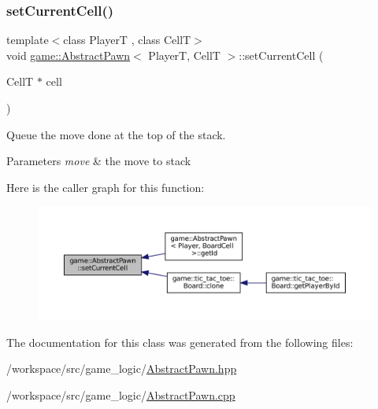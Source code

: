 \mbox{\label{classgame_1_1_abstract_pawn_a678ab4c2f0191bafa3e1e16cf04fa9d0}} 
\subsubsection{\texorpdfstring{set\+Current\+Cell()}{setCurrentCell()}}
{\footnotesize\ttfamily template$<$class PlayerT , class CellT$>$ \\
void \hyperlink{classgame_1_1_abstract_pawn}{game\+::\+Abstract\+Pawn}$<$ PlayerT, CellT $>$\+::set\+Current\+Cell (\begin{DoxyParamCaption}\item[{CellT $\ast$}]{cell }\end{DoxyParamCaption})}



Queue the move done at the top of the stack. 


\begin{DoxyParams}{Parameters}
{\em move} & the move to stack \\
\hline
\end{DoxyParams}
Here is the caller graph for this function\+:
\nopagebreak
\begin{figure}[H]
\begin{center}
\leavevmode
\includegraphics[width=350pt]{classgame_1_1_abstract_pawn_a678ab4c2f0191bafa3e1e16cf04fa9d0_icgraph}
\end{center}
\end{figure}


The documentation for this class was generated from the following files\+:\begin{DoxyCompactItemize}
\item 
/workspace/src/game\+\_\+logic/\hyperlink{_abstract_pawn_8hpp}{Abstract\+Pawn.\+hpp}\item 
/workspace/src/game\+\_\+logic/\hyperlink{_abstract_pawn_8cpp}{Abstract\+Pawn.\+cpp}\end{DoxyCompactItemize}
